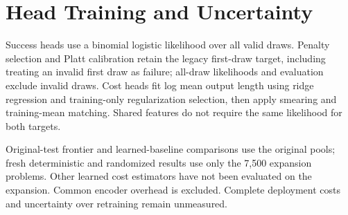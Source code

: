 \documentclass[10pt,twocolumn,letterpaper]{article}
\begin{document}
\section{Head Training and Uncertainty}
Success heads use a binomial logistic likelihood over all valid draws. Penalty selection and Platt calibration retain the legacy first-draw target, including treating an invalid first draw as failure; all-draw likelihoods and evaluation exclude invalid draws. Cost heads fit log mean output length using ridge regression and training-only regularization selection, then apply smearing and training-mean matching. Shared features do not require the same likelihood for both targets.

Original-test frontier and learned-baseline comparisons use the original pools; fresh deterministic and randomized results use only the 7,500 expansion problems. Other learned cost estimators have not been evaluated on the expansion. Common encoder overhead is excluded. Complete deployment costs and uncertainty over retraining remain unmeasured.
\end{document}

